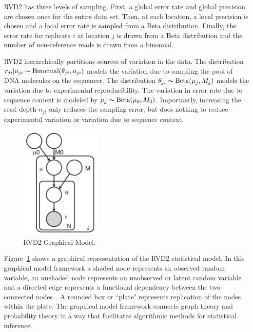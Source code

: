 \documentclass{bioinfo}
\begin{document}
RVD2 has three levels of sampling. First, a global error rate and global precision are chosen once for the entire data set. Then, at each location, a local precision is chosen and a local error rate is sampled from a Beta distribution. Finally, the error rate for replicate $i$ at location $j$ is drawn from a Beta distribution and the number of non-reference reads is drawn from a binomial.

RVD2 hierarchically partitions sources of variation in the data. The distribution $r_{ji} | n_{ji} \thicksim \text{Binomial}(\theta_{ji}, n_{ji})$ models the variation due to sampling the pool of DNA molecules on the sequencer. The distribution $\theta_{ji} \thicksim \text{Beta}(\mu_j, M_j)$ models the variation due to experimental reproducibility. The variation in error rate due to sequence context is modeled by $\mu_j \thicksim \text{Beta}(\mu_0, M_0)$. Importantly, increasing the read depth $n_{ji}$ only reduces the sampling error, but does nothing to reduce experimental variation or variation due to sequence context.

\begin{figure}[!bpth]
\begin{center}
\includegraphics[width=40mm]{pdf_figs/RVD2_model.pdf}
\caption{RVD2 Graphical Model.}
\label{fig:graphical_model}
\end{center}
\end{figure}

Figure~\ref{fig:graphical_model} shows a graphical representation of the RVD2 statistical model. In this graphical model framework a shaded node represents an observed random variable, an unshaded node represents an unobserved or latent random variable and a directed edge represents a functional dependency between the two connected nodes~\citep{jordan2004graphical}. A rounded box or ``plate" represents replication of the nodes within the plate. The graphical model framework connects graph theory and probability theory in a way that facilitates algorithmic methods for statistical inference.
\end{document}
